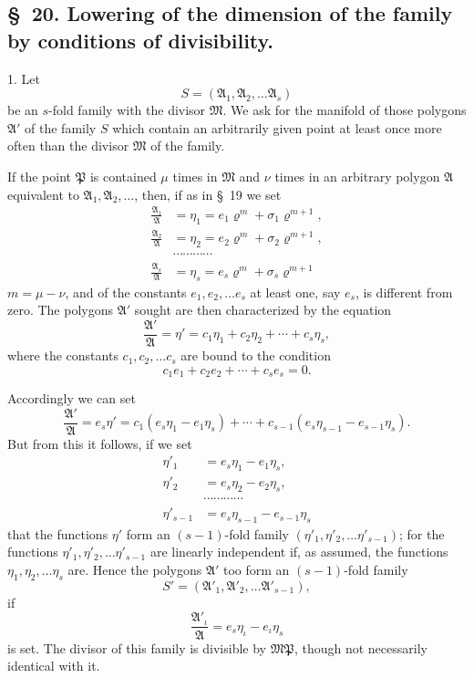 \documentclass{article}
\begin{document}
\subsection*{§~20. Lowering of the dimension of the family by conditions of divisibility.}

1. Let
\[ S = (\mathfrak{A}_{1}, \mathfrak{A}_{2}, \ldots \mathfrak{A}_{s}) \]
be an $s$-fold family with the divisor $\mathfrak{M}$. We ask for the manifold of those polygons $\mathfrak{A}'$ of the family $S$ which contain an arbitrarily given point at least once more often than the divisor $\mathfrak{M}$ of the family.

If the point $\mathfrak{P}$ is contained $\mu$ times in $\mathfrak{M}$ and $\nu$ times in an arbitrary polygon $\mathfrak{A}$ equivalent to $\mathfrak{A}_{1}, \mathfrak{A}_{2}, \ldots$, then, if as in §~19 we set
\[ \begin{aligned} \frac{\mathfrak{A}_{1}}{\mathfrak{A}} &= \eta_{1} = e_{1}\varrho^{m} + \sigma_{1}\varrho^{m+1}, \\ \frac{\mathfrak{A}_{2}}{\mathfrak{A}} &= \eta_{2} = e_{2}\varrho^{m} + \sigma_{2}\varrho^{m+1}, \\ &\cdots\cdots\cdots\cdots \\ \frac{\mathfrak{A}_{s}}{\mathfrak{A}} &= \eta_{s} = e_{s}\varrho^{m} + \sigma_{s}\varrho^{m+1} \end{aligned} \]
$m = \mu - \nu$, and of the constants $e_{1}, e_{2}, \ldots e_{s}$ at least one, say $e_{s}$, is different from zero. The polygons $\mathfrak{A}'$ sought are then characterized by the equation
\[ \frac{\mathfrak{A}'}{\mathfrak{A}} = \eta' = c_{1}\eta_{1} + c_{2}\eta_{2} + \cdots + c_{s}\eta_{s}, \]
where the constants $c_{1}, c_{2}, \ldots c_{s}$ are bound to the condition
\[ c_{1}e_{1} + c_{2}e_{2} + \cdots + c_{s}e_{s} = 0. \]

Accordingly we can set
\[ \frac{\mathfrak{A}'}{\mathfrak{A}} = e_{s}\eta' = c_{1}(e_{s}\eta_{1} - e_{1}\eta_{s}) + \cdots + c_{s-1}(e_{s}\eta_{s-1} - e_{s-1}\eta_{s}). \]
But from this it follows, if we set
\[ \begin{aligned} \eta'_{1} &= e_{s}\eta_{1} - e_{1}\eta_{s}, \\ \eta'_{2} &= e_{s}\eta_{2} - e_{2}\eta_{s}, \\ &\cdots\cdots\cdots\cdots \\ \eta'_{s-1} &= e_{s}\eta_{s-1} - e_{s-1}\eta_{s} \end{aligned} \]
that the functions $\eta'$ form an $(s-1)$-fold family $(\eta'_{1}, \eta'_{2}, \ldots \eta'_{s-1})$; for the functions $\eta'_{1}, \eta'_{2}, \ldots \eta'_{s-1}$ are linearly independent if, as assumed, the functions $\eta_{1}, \eta_{2}, \ldots \eta_{s}$ are. Hence the polygons $\mathfrak{A}'$ too form an $(s-1)$-fold family
\[ S' = (\mathfrak{A}'_{1}, \mathfrak{A}'_{2}, \ldots \mathfrak{A}'_{s-1}), \]
if
\[ \frac{\mathfrak{A}'_{\iota}}{\mathfrak{A}} = e_{s}\eta_{\iota} - e_{\iota}\eta_{s} \]
is set. The divisor of this family is divisible by $\mathfrak{M}\mathfrak{P}$, though not necessarily identical with it.
\end{document}
